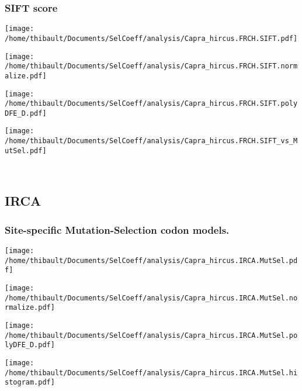 \subsubsection*{SIFT score} 
\begin{minipage}{0.49\linewidth} 
\texttt{[image: /home/thibault/Documents/SelCoeff/analysis/Capra\_hircus.FRCH.SIFT.pdf]} 
\end{minipage}
\begin{minipage}{0.49\linewidth} 
\texttt{[image: /home/thibault/Documents/SelCoeff/analysis/Capra\_hircus.FRCH.SIFT.normalize.pdf]} 
\end{minipage}
\begin{minipage}{0.49\linewidth} 
\texttt{[image: /home/thibault/Documents/SelCoeff/analysis/Capra\_hircus.FRCH.SIFT.polyDFE\_D.pdf]} 
\end{minipage}
\begin{minipage}{0.49\linewidth} 
\texttt{[image: /home/thibault/Documents/SelCoeff/analysis/Capra\_hircus.FRCH.SIFT\_vs\_MutSel.pdf]} 
\end{minipage}
\\ 
\subsection{IRCA} 
 
\subsubsection*{Site-specific Mutation-Selection codon models.} 
\begin{minipage}{0.49\linewidth} 
\texttt{[image: /home/thibault/Documents/SelCoeff/analysis/Capra\_hircus.IRCA.MutSel.pdf]} 
\end{minipage}
\begin{minipage}{0.49\linewidth} 
\texttt{[image: /home/thibault/Documents/SelCoeff/analysis/Capra\_hircus.IRCA.MutSel.normalize.pdf]} 
\end{minipage}
\begin{minipage}{0.49\linewidth} 
\texttt{[image: /home/thibault/Documents/SelCoeff/analysis/Capra\_hircus.IRCA.MutSel.polyDFE\_D.pdf]} 
\end{minipage}
\begin{minipage}{0.49\linewidth} 
\texttt{[image: /home/thibault/Documents/SelCoeff/analysis/Capra\_hircus.IRCA.MutSel.histogram.pdf]} 
\end{minipage}
\\ 
